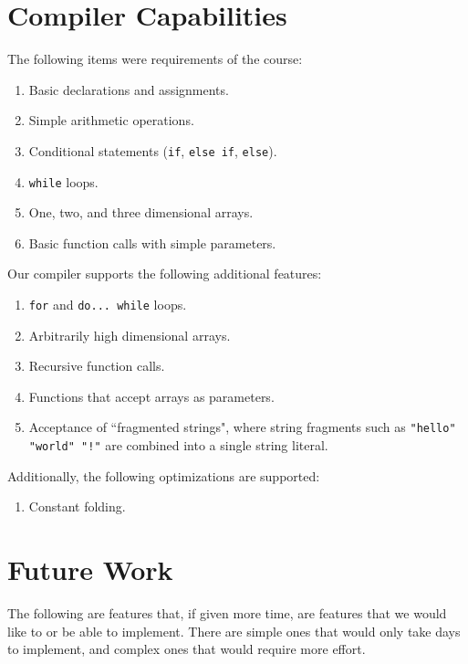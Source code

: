 \documentclass{article}
\begin{document}
\section{Compiler Capabilities}
\noindent The following items were requirements of the course:
  \begin{enumerate}
  \item Basic declarations and assignments.

  \item Simple arithmetic operations.

  \item Conditional statements (\texttt{if}, \texttt{else if}, \texttt{else}).

  \item \texttt{while} loops.

  \item One, two, and three dimensional arrays.

  \item Basic function calls with simple parameters.
  \end{enumerate}

\noindent Our compiler supports the following additional features:
  \begin{enumerate}
  \item \texttt{for} and \texttt{do... while} loops.

  \item Arbitrarily high dimensional arrays.

  \item Recursive function calls.

  \item Functions that accept arrays as parameters.

  \item Acceptance of ``fragmented strings", where string fragments such as
        \texttt{"hello" "world" "!"} are combined into a single string literal.
  \end{enumerate}

\hfill\newline
\noindent Additionally, the following optimizations are supported:
  \begin{enumerate}
  \item Constant folding.
  \end{enumerate}


\section{Future Work}
\noindent The following are features that, if given more time, are features that we would
like to or be able to implement. There are simple ones that would only take days
to implement, and complex ones that would require more effort.
\end{document}

